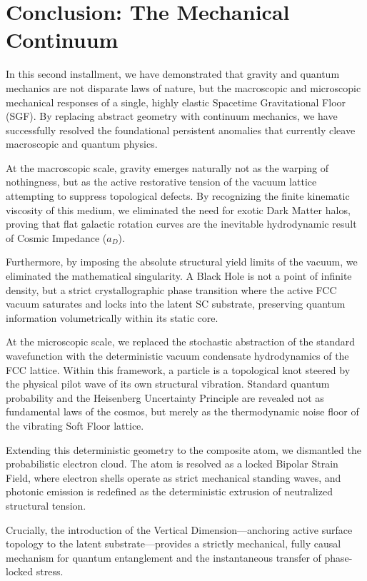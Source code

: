 \chapter{Conclusion: The Mechanical Continuum}
\label{chap:part_ii_conclusion}

In this second installment, we have demonstrated that gravity and quantum mechanics are not disparate laws of nature, but the macroscopic and microscopic mechanical responses of a single, highly elastic Spacetime Gravitational Floor (SGF). By replacing abstract geometry with continuum mechanics, we have successfully resolved the foundational persistent anomalies that currently cleave macroscopic and quantum physics.

At the macroscopic scale, gravity emerges naturally not as the warping of nothingness, but as the active restorative tension of the vacuum lattice attempting to suppress topological defects. By recognizing the finite kinematic viscosity of this medium, we eliminated the need for exotic Dark Matter halos, proving that flat galactic rotation curves are the inevitable hydrodynamic result of Cosmic Impedance ($a_D$).

Furthermore, by imposing the absolute structural yield limits of the vacuum, we eliminated the mathematical singularity. A Black Hole is not a point of infinite density, but a strict crystallographic phase transition where the active FCC vacuum saturates and locks into the latent SC substrate, preserving quantum information volumetrically within its static core.

At the microscopic scale, we replaced the stochastic abstraction of the standard wavefunction with the deterministic vacuum condensate hydrodynamics of the FCC lattice. Within this framework, a particle is a topological knot steered by the physical pilot wave of its own structural vibration. Standard quantum probability and the Heisenberg Uncertainty Principle are revealed not as fundamental laws of the cosmos, but merely as the thermodynamic noise floor of the vibrating Soft Floor lattice.

Extending this deterministic geometry to the composite atom, we dismantled the probabilistic electron cloud. The atom is resolved as a locked Bipolar Strain Field, where electron shells operate as strict mechanical standing waves, and photonic emission is redefined as the deterministic extrusion of neutralized structural tension.

Crucially, the introduction of the Vertical Dimension---anchoring active surface topology to the latent substrate---provides a strictly mechanical, fully causal mechanism for quantum entanglement and the instantaneous transfer of phase-locked stress.

